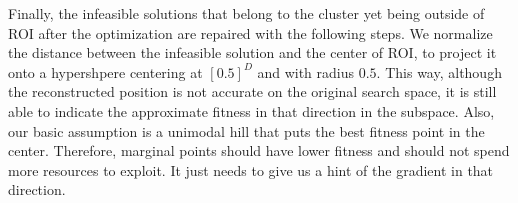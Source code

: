 Finally, the infeasible solutions that belong to the cluster yet being outside of ROI after the optimization are repaired with the following steps.
We normalize the distance between the infeasible solution and the center of ROI,
to project it onto a hypershpere centering at $[0.5]^D$ and with radius $0.5$.
This way, although the reconstructed position is not accurate on the original search space,
it is still able to indicate the approximate fitness in that direction in the subspace.
Also, our basic assumption is a unimodal hill that puts the best fitness point in the center.
Therefore, marginal points should have lower fitness and should not spend more resources to exploit.
It just needs to give us a hint of the gradient in that direction.


